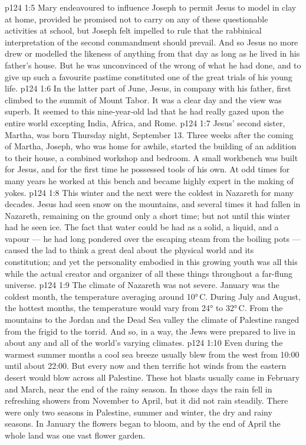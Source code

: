 \vs p124 1:5 Mary endeavoured to influence Joseph to permit Jesus to model in clay at home, provided he promised not to carry on any of these questionable activities at school, but Joseph felt impelled to rule that the rabbinical interpretation of the second commandment should prevail. And so Jesus no more drew or modelled the likeness of anything from that day as long as he lived in his father’s house. But he was unconvinced of the wrong of what he had done, and to give up such a favourite pastime constituted one of the great trials of his young life.
\vs p124 1:6 \pc In the latter part of June, Jesus, in company with his father, first climbed to the summit of Mount Tabor. It was a clear day and the view was superb. It seemed to this nine\hyp{}year\hyp{}old lad that he had really gazed upon the entire world excepting India, Africa, and Rome.
\vs p124 1:7 \pc Jesus’ second sister, Martha, was born Thursday night, September 13. Three weeks after the coming of Martha, Joseph, who was home for awhile, started the building of an addition to their house, a combined workshop and bedroom. A small workbench was built for Jesus, and for the first time he possessed tools of his own. At odd times for many years he worked at this bench and became highly expert in the making of yokes.
\vs p124 1:8 \pc This winter and the next were the coldest in Nazareth for many decades. Jesus had seen snow on the mountains, and several times it had fallen in Nazareth, remaining on the ground only a short time; but not until this winter had he seen ice. The fact that water could be had as a solid, a liquid, and a vapour --- he had long pondered over the escaping steam from the boiling pots --- caused the lad to think a great deal about the physical world and its constitution; and yet the personality embodied in this growing youth was all this while the actual creator and organizer of all these things throughout a far\hyp{}flung universe.
\vs p124 1:9 The climate of Nazareth was not severe. January was the coldest month, the temperature averaging around 10°\,C. During July and August, the hottest months, the temperature would vary from 24° to 32°\,C. From the mountains to the Jordan and the Dead Sea valley the climate of Palestine ranged from the frigid to the torrid. And so, in a way, the Jews were prepared to live in about any and all of the world’s varying climates.
\vs p124 1:10 Even during the warmest summer months a cool sea breeze usually blew from the west from 10:00 until about 22:00. But every now and then terrific hot winds from the eastern desert would blow across all Palestine. These hot blasts usually came in February and March, near the end of the rainy season. In those days the rain fell in refreshing showers from November to April, but it did not rain steadily. There were only two seasons in Palestine, summer and winter, the dry and rainy seasons. In January the flowers began to bloom, and by the end of April the whole land was one vast flower garden.

